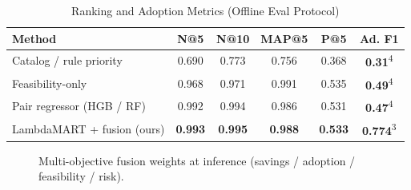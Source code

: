 \documentclass[conference]{IEEEtran}
\begin{document}
\begin{table}[htbp]
\caption{Ranking and Adoption Metrics (Offline Eval Protocol)}
\begin{center}
\renewcommand{\arraystretch}{1.2}
\setlength{\tabcolsep}{2pt}
\begin{tabularx}{\columnwidth}{|X|c|c|c|c|c|}
\hline
\textbf{Method} & \textbf{N@5} & \textbf{N@10} & \textbf{MAP@5} & \textbf{P@5} & \textbf{Ad. F1} \\
\hline
Catalog / rule priority & 0.690 & 0.773 & 0.756 & 0.368 & \textbf{0.31}\textsuperscript{4} \\
Feasibility-only & 0.968 & 0.971 & 0.991 & 0.535 & \textbf{0.49}\textsuperscript{4} \\
Pair regressor (HGB / RF) & 0.992 & 0.994 & 0.986 & 0.531 & \textbf{0.47}\textsuperscript{4} \\
LambdaMART + fusion (ours) & \textbf{0.993} & \textbf{0.995} & \textbf{0.988} & \textbf{0.533} & \textbf{0.774}\textsuperscript{3} \\
\hline
\end{tabularx}
\label{tab:ranking_metrics}
\end{center}
\end{table}

\begin{figure}[!htbp]
\centering
{}
\caption{Multi-objective fusion weights at inference (savings / adoption / feasibility / risk).}
\label{fig:fusion_weights}
\end{figure}
\end{document}
